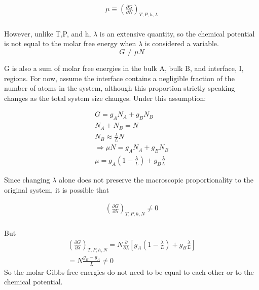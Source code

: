 \documentclass[11pt, oneside]{article}   	%
\begin{document}
\begin{gather}
\mu \equiv \left(\frac{\partial G}{\partial N}\right)_{T,P,h,\lambda}\\
\end{gather}

However, unlike T,P, and h, $\lambda$ is an extensive quantity, so the chemical potential is not equal to the molar free energy when $\lambda$ is considered a variable.
\begin{equation}
G\neq\mu N
\end{equation}


G is also a sum of molar free energies in the bulk A, bulk B, and interface, I, regions. For now, assume the interface contains a negligible fraction of the number of atoms in the system, although this proportion strictly speaking changes as the total system size changes. Under this assumption:

\begin{gather}
G = g_AN_A+g_BN_B\\
N_A+N_B=N\\
N_B\approx\frac{\lambda}{L}N\\
\Rightarrow \mu N = g_AN_A+g_BN_B\\
\mu = g_A\left(1-\frac{\lambda}{L}\right)+g_B\frac{\lambda}{L}
\end{gather}

Since changing $\lambda$ alone does not preserve the macroscopic proportionality to the original system, it is possible that

\begin{gather}
\left(\frac{\partial G}{\partial \lambda}\right)_{T,P,h,N}\neq 0\\
\end{gather}

But
\begin{gather}
\left(\frac{\partial G}{\partial \lambda}\right)_{T,P,h,N}=N\frac{\partial}{\partial\lambda} \left[g_A\left(1-\frac{\lambda}{L}\right)+g_B\frac{\lambda}{L}\right] \\
=N\frac{g_B-g_A}{L}\neq 0
\end{gather}
So the molar Gibbs free energies do not need to be equal to each other or to the chemical potential.
\end{document}
